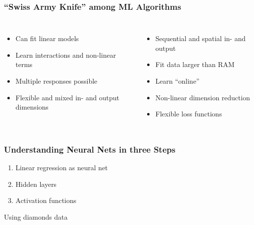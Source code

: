 \documentclass[
    utf8,
    aspectratio=169
]{beamer}  %
\begin{document}
\begin{frame}
\frametitle{``Swiss Army Knife'' among ML Algorithms}
\begin{columns}
	\begin{itemize}
		\item Can fit linear models
		\item Learn interactions and non-linear terms
		\item Multiple responses possible
		\item Flexible and mixed in- and output dimensions
	\end{itemize}
	
	\begin{itemize}
		\item Sequential and spatial in- and output
		\item Fit data larger than RAM
		\item Learn ``online''
		\item Non-linear dimension reduction
		\item Flexible loss functions
	\end{itemize}
\end{columns}
\end{frame}

\begin{frame}
	\frametitle{Understanding Neural Nets in three Steps}
	\begin{enumerate}
		\item Linear regression as neural net
		\item Hidden layers
		\item Activation functions
	\end{enumerate}

	\vfill
	
	Using \alert{diamonds} data
\end{frame}
\end{document}
